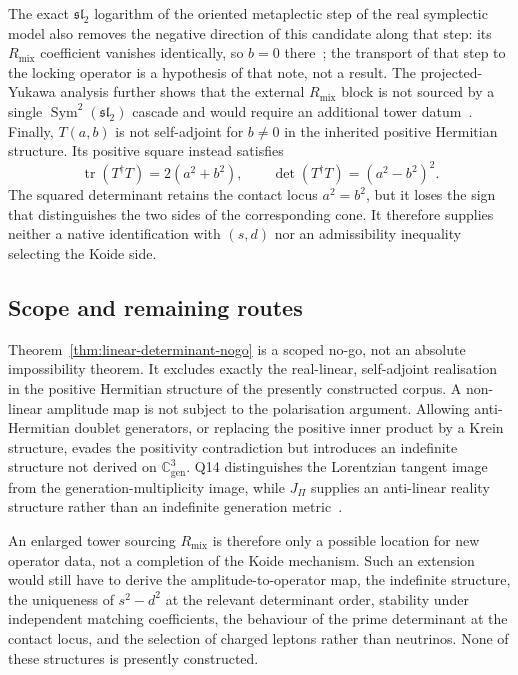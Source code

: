 \documentclass[11pt]{article}
\theoremstyle{definition}
\theoremstyle{remark}
\newcommand{\Cgen}{\mathbb{C}^{3}_{\mathrm{gen}}}
\begin{document}
      The exact $\mathfrak{sl}_2$ logarithm of the oriented metaplectic step of the real symplectic model also removes
      the negative direction of this candidate along that step: its $R_{\mathrm{mix}}$ coefficient vanishes
      identically, so $b=0$ there~\cite{Beau2026prs}; the transport of that step to the locking operator is a
      hypothesis of that note, not a result.
      The projected-Yukawa analysis further shows that the external $R_{\mathrm{mix}}$ block is not sourced by a
      single $\operatorname{Sym}^2(\mathfrak{sl}_2)$ cascade and would require an additional tower
      datum~\cite{Beau2026pyo}.
      Finally, $T(a,b)$ is not self-adjoint for $b\neq0$ in the inherited positive Hermitian structure.
      Its positive square instead satisfies
      \begin{equation}
        \label{eq:q14-positive-square}
        \operatorname{tr}(T^\dagger T)=2(a^2+b^2),
        \qquad
        \det(T^\dagger T)=(a^2-b^2)^2.
      \end{equation}
      The squared determinant retains the contact locus $a^2=b^2$, but it loses the sign that distinguishes the
      two sides of the corresponding cone.
      It therefore supplies neither a native identification with $(s,d)$ nor an admissibility inequality selecting
      the Koide side.

    \subsection{Scope and remaining routes}
      \label{subsec:determinant-nogo-scope}

      Theorem~\ref{thm:linear-determinant-nogo} is a scoped no-go, not an absolute impossibility theorem.
      It excludes exactly the real-linear, self-adjoint realisation in the positive Hermitian structure of the
      presently constructed corpus.
      A non-linear amplitude map is not subject to the polarisation argument.
      Allowing anti-Hermitian doublet generators, or replacing the positive inner product by a Krein structure,
      evades the positivity contradiction but introduces an indefinite structure not derived on $\Cgen$.
      Q14 distinguishes the Lorentzian tangent image from the generation-multiplicity image, while $J_\Pi$ supplies
      an anti-linear reality structure rather than an indefinite generation metric~\cite{Beau2026q14}.

      An enlarged tower sourcing $R_{\mathrm{mix}}$ is therefore only a possible location for new operator data,
      not a completion of the Koide mechanism.
      Such an extension would still have to derive the amplitude-to-operator map, the indefinite structure, the
      uniqueness of $s^2-d^2$ at the relevant determinant order, stability under independent matching
      coefficients, the behaviour of the prime determinant at the contact locus, and the selection of charged
      leptons rather than neutrinos.
      None of these structures is presently constructed.
\end{document}
